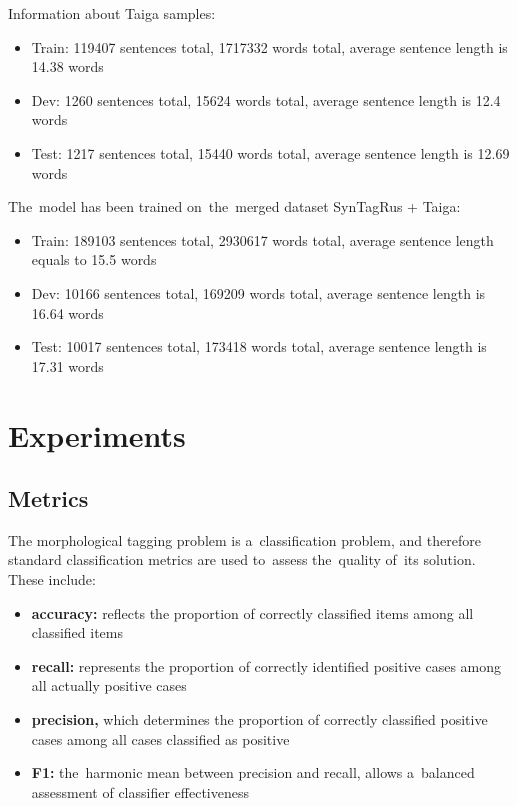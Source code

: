 \documentclass[11pt,twocolumn]{article}
\begin{document}
  Information about   Taiga samples:
  
\begin{itemize}
  \item {
Train:
119407 sentences total,
1717332 words total,
average sentence length is  14.38 words
}
\item {
Dev:
1260 sentences total,
15624 words total,
average sentence length is  12.4 words
}
\item {
Test:
1217 sentences total,
15440 words total,
average sentence length is 12.69 words
}
\end{itemize}

The~model has been trained on~the~merged dataset SynTagRus + Taiga:

\begin{itemize}
\item {
Train:
189103 sentences total,
2930617 words total,
average sentence length equals to 15.5 words
}
\item{
Dev:
10166 sentences total,
169209 words total,
average sentence length is 16.64 words
}
\item{
Test:
10017 sentences total,
173418 words total,
average sentence length is 17.31 words
}
  \end{itemize}



  \section{Experiments}

  \subsection{Metrics}

The morphological tagging problem is a~classification problem,
and therefore standard classification metrics are used to~assess the~quality of~its solution.
These include:

\begin{itemize}
\item {{\bf accuracy:} reflects the proportion of correctly classified items among all classified items}
\item {{\bf recall:} represents the proportion of correctly identified positive cases among all actually positive cases}
\item {{\bf precision,} which determines the proportion of correctly classified positive cases among all cases classified as positive}
\item{{\bf F1:} the~harmonic mean between precision and recall,
  allows a~balanced assessment of classifier effectiveness}
  \end{itemize}
\end{document}
